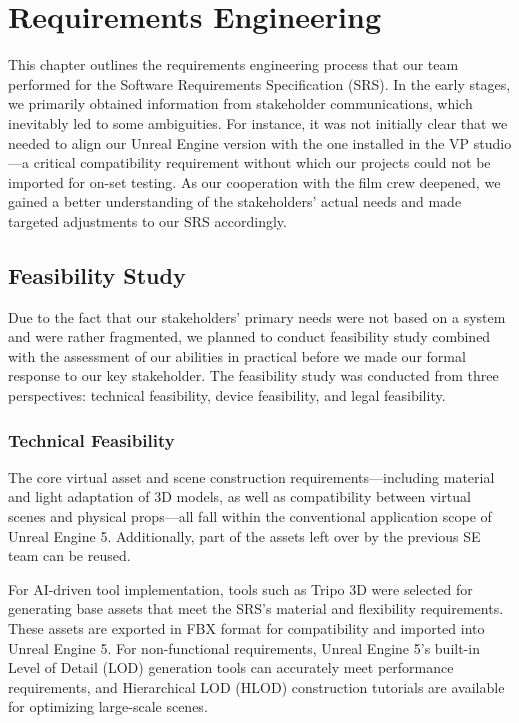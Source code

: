 \documentclass[12pt,a4paper]{report}
\begin{document}
\chapter{Requirements Engineering}
This chapter outlines the requirements engineering process that our team performed for the Software Requirements Specification (SRS). In the early stages, we primarily obtained information from stakeholder communications, which inevitably led to some ambiguities. For instance, it was not initially clear that we needed to align our Unreal Engine version with the one installed in the VP studio—a critical compatibility requirement without which our projects could not be imported for on-set testing. As our cooperation with the film crew deepened, we gained a better understanding of the stakeholders' actual needs and made targeted adjustments to our SRS accordingly.

\section{Feasibility Study}

Due to the fact that our stakeholders' primary needs were not based on a system and were rather fragmented, we planned to conduct feasibility study combined with the assessment of our abilities in practical before we made our formal response to our key stakeholder. The feasibility study was conducted from three perspectives: technical feasibility, device feasibility, and legal feasibility.

\subsection{Technical Feasibility}

The core virtual asset and scene construction requirements—including material and light adaptation of 3D models, as well as compatibility between virtual scenes and physical props—all fall within the conventional application scope of Unreal Engine 5. Additionally, part of the assets left over by the previous SE team can be reused.

For AI-driven tool implementation, tools such as Tripo 3D were selected for generating base assets that meet the SRS's material and flexibility requirements. These assets are exported in FBX format for compatibility and imported into Unreal Engine 5. For non-functional requirements, Unreal Engine 5's built-in Level of Detail (LOD) generation tools can accurately meet performance requirements, and Hierarchical LOD (HLOD) construction tutorials are available for optimizing large-scale scenes.
\end{document}
